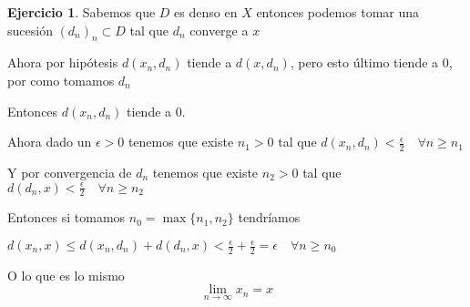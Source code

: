 \documentclass[12pt]{article}
\newcommand{\ra}{\rightarrow}
\theoremstyle{definition}
\newtheorem{ej}{Ejercicio}
\begin{document}
\begin{ej}
	Sabemos que $D$ es denso en $X$ entonces podemos tomar una sucesión $(d_n)_n \subset D$ tal que $d_n$ converge a $x$

	Ahora por hipótesis $d(x_n,d_n)$ tiende a $d(x,d_n)$, pero esto último tiende a 0, por como tomamos $d_n$

	Entonces $d(x_n,d_n)$ tiende a 0.

	Ahora dado un $\epsilon >0$ tenemos que existe $n_1 > 0 $ tal que $d(x_n,d_n) < \frac{\epsilon}{2} \quad \forall n \geq n_1$

	Y por convergencia de $d_n$ tenemos que existe $n_2 > 0$ tal que $d(d_n,x) < \frac{\epsilon}{2} \quad \forall n \geq n_2$

	Entonces si tomamos $n_0 =  \max\{n_1,n_2\}$ tendríamos

	$d(x_n,x) \leq d(x_n,d_n) + d(d_n,x) < \frac{\epsilon}{2} + \frac{\epsilon}{2} = \epsilon \quad \forall n \geq n_0$ 

	O lo que es lo mismo $$\lim_{n\ra\infty} x_n = x$$
\end{ej}
\end{document}
